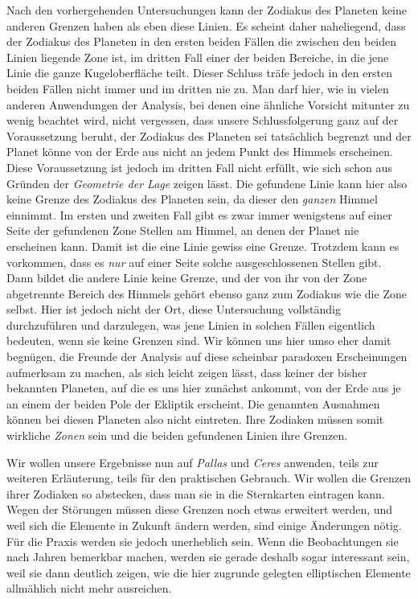 Nach den vorhergehenden Untersuchungen kann der Zodiakus des Planeten
keine anderen Grenzen haben als eben diese Linien. Es scheint daher
naheliegend, dass der Zodiakus des Planeten in den ersten beiden
Fällen die zwischen den beiden Linien liegende Zone ist, im dritten
Fall einer der beiden Bereiche, in die jene Linie die ganze
Kugeloberfläche teilt. Dieser Schluss träfe jedoch in den ersten
beiden Fällen nicht immer und im dritten nie zu. Man darf hier,
wie in vielen anderen Anwendungen der Analysis, bei denen eine
ähnliche Vorsicht mitunter zu wenig beachtet wird, nicht vergessen,
dass unsere Schlussfolgerung ganz auf der Voraussetzung beruht, der
Zodiakus des Planeten sei tatsächlich begrenzt und der Planet könne
von der Erde aus nicht an jedem Punkt des Himmels erscheinen. Diese
Voraussetzung ist jedoch im dritten Fall nicht erfüllt, wie sich
schon aus Gründen der \textit{Geometrie der Lage} zeigen lässt. Die gefundene
Linie kann hier also keine Grenze des Zodiakus des Planeten sein,
da dieser den \textit{ganzen} Himmel einnimmt. Im ersten und zweiten
Fall gibt es zwar immer wenigstens auf einer Seite der gefundenen
Zone Stellen am Himmel, an denen der Planet nie erscheinen kann.
Damit ist die eine Linie gewiss eine Grenze. Trotzdem kann es
vorkommen, dass es \textit{nur} auf einer Seite solche ausgeschlossenen
Stellen gibt. Dann bildet die andere Linie keine Grenze, und der
von ihr von der Zone abgetrennte Bereich des Himmels gehört ebenso
ganz zum Zodiakus wie die Zone selbst. Hier ist jedoch nicht der Ort,
diese Untersuchung vollständig durchzuführen und darzulegen, was
jene Linien in solchen Fällen eigentlich bedeuten, wenn sie keine
Grenzen sind. Wir können uns hier umso eher damit begnügen, die
Freunde der Analysis auf diese scheinbar paradoxen Erscheinungen
aufmerksam zu machen, als sich leicht zeigen lässt, dass keiner der
bisher bekannten Planeten, auf die es uns hier zunächst ankommt,
von der Erde aus je an einem der beiden Pole der Ekliptik erscheint.
Die genannten Ausnahmen können bei diesen Planeten also nicht
eintreten. Ihre Zodiaken müssen somit wirkliche \textit{Zonen} sein
und die beiden gefundenen Linien ihre Grenzen.

Wir wollen unsere Ergebnisse nun auf \textit{Pallas} und \textit{Ceres}
anwenden, teils zur weiteren Erläuterung, teils für den praktischen
Gebrauch.
%
Wir wollen die Grenzen ihrer Zodiaken so abstecken, dass man sie in
die Sternkarten eintragen kann. Wegen der Störungen müssen diese
Grenzen noch etwas erweitert werden, und weil sich die Elemente in
Zukunft ändern werden, sind einige Änderungen nötig. Für die Praxis
werden sie jedoch unerheblich sein. Wenn die Beobachtungen sie nach
Jahren bemerkbar machen, werden sie gerade deshalb sogar interessant
sein, weil sie dann deutlich zeigen, wie die hier zugrunde gelegten
elliptischen Elemente allmählich nicht mehr ausreichen.

